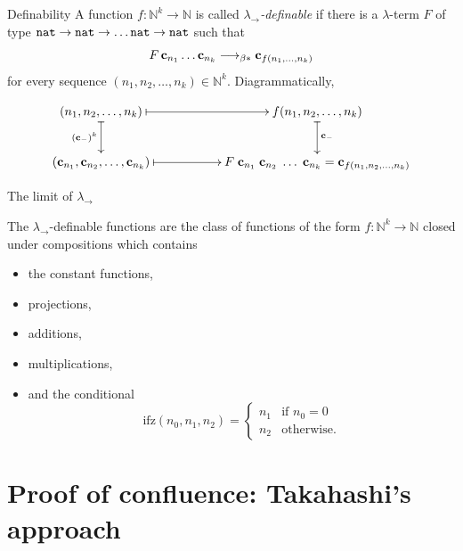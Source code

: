 \begin{frame}{Definability}
  A function $f\colon \mathbb{N}^k \to \mathbb{N}$ is called
  \alert{\emph{$\lambda_\to$-definable}} if there is a $\lambda$-term $F$ of
  type $\mathtt{nat} \to \mathtt{nat} \to \dots \mathtt{nat} \to \mathtt{nat}$ such that
  \[
    F\,\mathbf{c}_{n_1}\ldots\mathbf{c}_{n_k} \longrightarrow_{\beta*} \mathbf{c}_{f(n_1, \dots, n_k)}
  \]
  for every sequence $(n_1, n_2, \ldots, n_k) \in \mathbb{N}^k$.
  Diagrammatically, 

\[
  \xymatrix{
    (n_1, n_2, \ldots, n_k) \ar@{|->}[rr] \ar@{|->}[d]_{(\bc_{-})^k} & & f(n_1,
    n_2, \ldots, n_k) \ar@{|->}[d]^{\bc_{-}}\\
    (\bc_{n_1}, \bc_{n_2}, \ldots, \bc_{n_k}) \ar@{|->}[rr] & & 
    F\;\bc_{n_1}\; \bc_{n_2}\; \ldots\;\bc_{n_k}
    = \bc_{f(n_1, n_2, \ldots, n_k)}
  }
\]
\end{frame}
\begin{frame}{The limit of $\lambda_\to$}
\begin{theorem}
  The $\lambda_\to$-definable functions are the class of functions
  of the form $f\colon \mathbb{N}^k \to \mathbb{N}$ closed under 
  compositions
  which contains
  \begin{itemize}
    \item the constant functions,
    \item projections,
    \item additions,
    \item multiplications,
    \item and the conditional 
  \[
    \mathrm{ifz}(n_0, n_1, n_2) = 
    \begin{cases}
      n_1 & \text{if } n_0 = 0\\
      n_2 & \text{otherwise.}
    \end{cases}
  \]
  \end{itemize}
\end{theorem}
\end{frame}

\section{Proof of confluence: Takahashi's approach}

